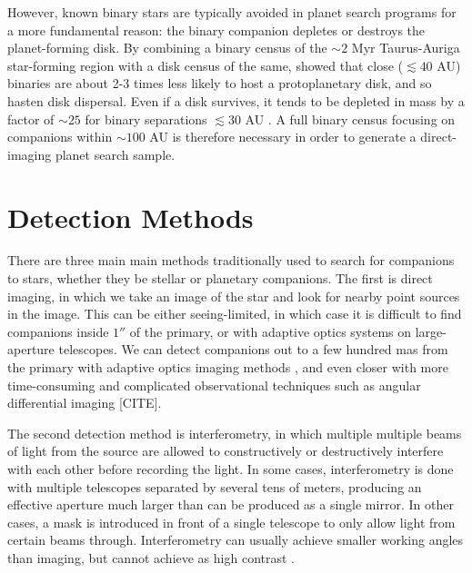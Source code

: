 \documentclass{utthesis}
\begin{document}
However, known binary stars are typically avoided in planet search programs for a more fundamental reason: the binary companion depletes or destroys the planet-forming disk. By combining a binary census of the $\sim 2$ Myr Taurus-Auriga star-forming region with a disk census of the same, \cite{Kraus2012} showed that close ($\lesssim 40$ AU) binaries are about 2-3 times less likely to host a protoplanetary disk, and so hasten disk dispersal. Even if a disk survives, it tends to be depleted in mass by a factor of $\sim 25$ for binary separations $\lesssim 30$ AU \citep{Harris2012}. A full binary census focusing on companions within $\sim 100$ AU is therefore necessary in order to generate a direct-imaging planet search sample.

\section{Detection Methods}

There are three main main methods traditionally used to search for companions to stars, whether they be stellar or planetary companions. The first is direct imaging, in which we take an image of the star and look for nearby point sources in the image. This can be either seeing-limited, in which case it is difficult to find companions inside $1''$ of the primary, or with adaptive optics systems on large-aperture telescopes. We can detect companions out to a few hundred mas from the primary with adaptive optics imaging methods \citep[see][for typical sensitivity curves]{DeRosa2014}, and even closer with more time-consuming and complicated observational techniques such as angular differential imaging [CITE]. 

The second detection method is interferometry, in which multiple multiple beams of light from the source are allowed to constructively or destructively interfere with each other before recording the light. In some cases, interferometry is done with multiple telescopes separated by several tens of meters, producing an effective aperture much larger than can be produced as a single mirror. In other cases, a mask is introduced in front of a single telescope to only allow light from certain beams through. Interferometry can usually achieve smaller working angles than imaging, but cannot achieve as high contrast \citep[see e.g.][]{Aldoretta2015}.
\end{document}
